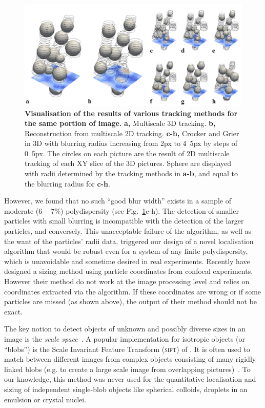 \documentclass[8.5pt,twoside,twocolumn]{article}
\begin{document}
\begin{figure}
\centering
\includegraphics{fig_localise.pdf}
\caption{\textbf{Visualisation of the results of various tracking methods for the same portion of image.} \textbf{a,} Multiscale 3D tracking. \textbf{b,} Reconstruction from multiscale 2D tracking. \textbf{c-h,} Crocker and Grier in 3D with blurring radius increasing from \unit{2}{px} to \unit{4.5}{px} by steps of \unit{0.5}{px}. The circles on each picture are the result of 2D multiscale tracking of each XY slice of the 3D pictures. Sphere are displayed with radii determined by the tracking methods in \textbf{a-b}, and equal to the blurring radius for \textbf{c-h}.}
	\label{fig:localise}
\end{figure}

However, we found that no such ``good blur width'' exists in a sample of moderate ($6-7\%$) polydispersity (see Fig.~\ref{fig:localise}c-h). The detection of smaller particles with small blurring is incompatible with the detection of the larger particles, and conversely. This unacceptable failure of the \citet{Crocker1996} algorithm, as well as the want of the particles' radii data, triggered our design of a novel localisation algorithm that would be robust even for a system of any finite polydispersity, which is unavoidable and sometime desired in real experiments. Recently \citet{Kurita2011,Kurita2011b} have designed a sizing method using particle coordinates from confocal experiments. However their method do not work at the image processing level and relies on coordinates extracted via the \citet{Crocker1996} algorithm. If these coordinates are wrong or if some particles are missed (as shown above), the output of their method should not be exact.

The key notion to detect objects of unknown and possibly diverse sizes in an image is the \emph{scale space}~\cite{Lindeberg1993}. A popular implementation for isotropic objects (or ``blobs'') is the Scale Invariant Feature Transform (\textsc{sift}) of \citet{Lowe2004}. It is often used to match between different images from complex objects consisting of many rigidly linked blobs (e.g. to create a large scale image from overlapping pictures)~\citep{Lowe2004, Urschler2006, Cheung2009}. To our knowledge, this method was never used for the quantitative localisation and sizing of independent single-blob objects like spherical colloids, droplets in an emulsion or crystal nuclei.
\end{document}
